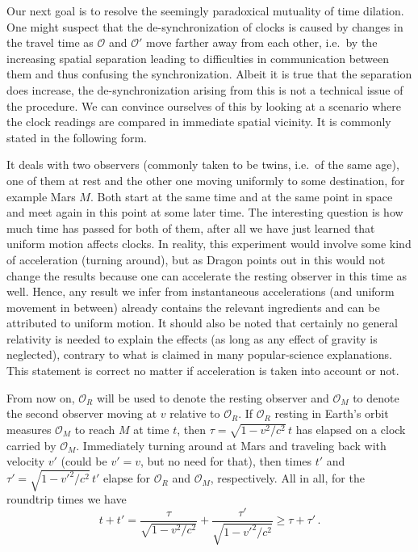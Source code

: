 \documentclass[../relativity_main.tex]{subfiles}
\begin{document}
Our next goal is to resolve the seemingly paradoxical mutuality of time dilation. One might suspect that the de-synchronization of clocks is caused by changes in the travel time as $\mathcal{O}$ and $\mathcal{O}'$ move farther away from each other, i.e.~by the increasing spatial separation leading to difficulties in communication between them and thus confusing the synchronization. Albeit it is true that the separation does increase, the de-synchronization arising from this is not a technical issue of the procedure. We can convince ourselves of this by looking at a scenario where the clock readings are compared in immediate spatial vicinity. It is commonly stated in the following form.
\begin{ex}\label{ex:twin_paradox_1}
	It deals with two observers (commonly taken to be twins, i.e.~of the same age), one of them at rest and the other one moving uniformly to some destination, for example Mars $M$. Both start at the same time and at the same point in space and meet again in this point at some later time. The interesting question is how much time has passed for both of them, after all we have just learned that uniform motion affects clocks. In reality, this experiment would involve some kind of acceleration (turning around), but as Dragon points out in \cite{dragon_geometry_srt} this would not change the results because one can accelerate the resting observer in this time as well. Hence, any result we infer from instantaneous accelerations (and uniform movement in between) already contains the relevant ingredients and can be attributed to uniform motion. It should also be noted that certainly no general relativity is needed to explain the effects (as long as any effect of gravity is neglected), contrary to what is claimed in many popular-science explanations. This statement is correct no matter if acceleration is taken into account or not.
	
	From now on, $\mathcal{O}_R$ will be used to denote the resting observer and $\mathcal{O}_M$ to denote the second observer moving at $v$ relative to $\mathcal{O}_R$. If $\mathcal{O}_R$ resting in Earth's orbit measures $\mathcal{O}_M$ to reach $M$ at time $t$, then $\tau = \sqrt{1 - v^2 / c^2} \, t$ has elapsed on a clock carried by $\mathcal{O}_M$. Immediately turning around at Mars and traveling back with velocity $v'$ (could be $v' = v$, but no need for that), then times $t'$ and $\tau' = \sqrt{1 - v'^2 / c^2} \, t'$ elapse for $\mathcal{O}_R$ and $\mathcal{O}_M$, respectively. All in all, for the roundtrip times we have
	\begin{equation*}
		t + t' = \frac{\tau}{\sqrt{1 - v^2 / c^2}} + \frac{\tau'}{\sqrt{1 - v'^2 / c^2}} \geq \tau + \tau' \, .
	\end{equation*}


\end{ex}
\end{document}
